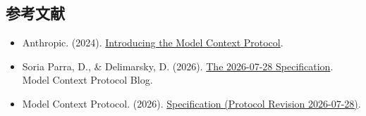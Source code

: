 \FloatBarrier
{}
\hypertarget{ux53c2ux8003ux6587ux732e-123}{%
\subsection{参考文献}\label{ux53c2ux8003ux6587ux732e-123}}

\vspace{0.25em}
\begin{itemize}
\tightlist
\item
  Anthropic. (2024). \href{https://www.anthropic.com/news/model-context-protocol}{Introducing the Model Context Protocol}.
\item
  Soria Parra, D., \& Delimarsky, D. (2026). \href{https://blog.modelcontextprotocol.io/posts/2026-07-28/}{The 2026-07-28 Specification}. Model Context Protocol Blog.
\item
  Model Context Protocol. (2026). \href{https://modelcontextprotocol.io/specification/2026-07-28}{Specification (Protocol Revision 2026-07-28)}.
\end{itemize}

\clearpage
